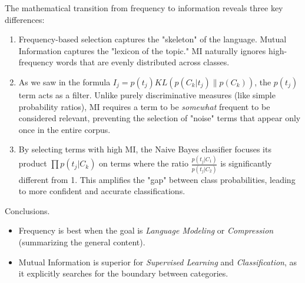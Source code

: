 The mathematical transition from frequency to information reveals three key differences:

\begin{enumerate}
    \item Frequency-based selection captures the "skeleton" of the language. Mutual Information captures the "lexicon of the topic." MI naturally ignores high-frequency words that are evenly distributed across classes.
    \item As we saw in the formula $I_j = p(t_j) KL(p(C_k|t_j) \| p(C_k))$, the $p(t_j)$ term acts as a filter. Unlike purely discriminative measures (like simple probability ratios), MI requires a term to be \textit{somewhat} frequent to be considered relevant, preventing the selection of "noise" terms that appear only once in the entire corpus.
    \item By selecting terms with high MI, the Naive Bayes classifier focuses its product $\prod p(t_j|C_k)$ on terms where the ratio $\frac{p(t_j|C_1)}{p(t_j|C_2)}$ is significantly different from 1. This amplifies the "gap" between class probabilities, leading to more confident and accurate classifications.
\end{enumerate}

\medskip
Conclusions.

\begin{itemize}
    \item Frequency is best when the goal is \textit{Language Modeling} or \textit{Compression} (summarizing the general content).
    \item Mutual Information is superior for \textit{Supervised Learning} and \textit{Classification}, as it explicitly searches for the boundary between categories.
\end{itemize}



%